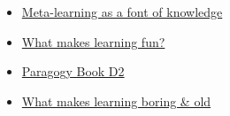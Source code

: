 \begin{itemize}
\item
  \href{http://paragogy.net/index.php?title=Meta-learning\_as\_a\_font\_of\_knowledge\&oldid=439}{Meta-learning
  as a font of knowledge}
\item
  \href{http://paragogy.net/index.php?title=What\_makes\_learning\_fun\%3F\&oldid=443}{What
  makes learning fun?}
\item
  \href{http://paragogy.net/index.php?title=Paragogy\_Book\_D2\&oldid=735}{Paragogy
  Book D2}
\item
  \href{http://paragogy.net/index.php?title=What\_makes\_learning\_boring\&oldid=442}{What
  makes learning boring \& old}
\end{itemize}

